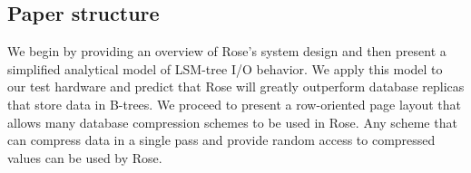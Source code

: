 \documentclass{vldb}
\newcommand{\rows}{Rose\xspace}
\newcommand{\rowss}{Rose's\xspace}
\begin{document}





\subsection{Paper structure}

We begin by providing an overview of \rowss system design and then
present a simplified analytical model of LSM-tree I/O behavior.  We
apply this model to our test hardware and predict that \rows will
greatly outperform database replicas that store data in B-trees.  We
proceed to present a row-oriented page layout that allows many
database compression schemes to be used in \rows.  Any scheme that can
compress data in a single pass and provide random access to compressed
values can be used by \rows.
\end{document}
